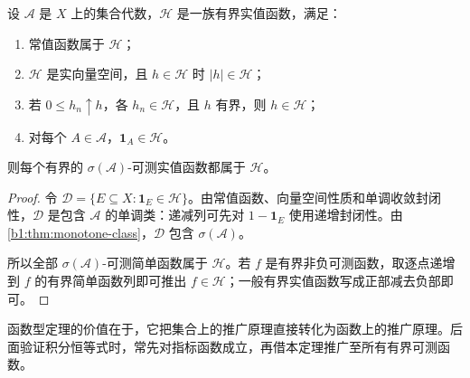 \begin{theorem}
\label{b1:thm:functional-monotone-class}
设 \(\mathcal A\) 是 \(X\) 上的集合代数，\(\mathcal H\) 是一族有界实值函数，满足：
\begin{enumerate}
  \item 常值函数属于 \(\mathcal H\)；
  \item \(\mathcal H\) 是实向量空间，且 \(h\in\mathcal H\) 时 \(\lvert h\rvert\in\mathcal H\)；
  \item 若 \(0\leq h_n\uparrow h\)，各 \(h_n\in\mathcal H\)，且 \(h\) 有界，则 \(h\in\mathcal H\)；
  \item 对每个 \(A\in\mathcal A\)，\(\mathbf 1_A\in\mathcal H\)。
\end{enumerate}
则每个有界的 \(\sigma(\mathcal A)\)-可测实值函数都属于 \(\mathcal H\)。
\end{theorem}
\begin{proof}
令 \(\mathcal D=\{E\subseteq X:\mathbf 1_E\in\mathcal H\}\)。由常值函数、向量空间性质和单调收敛封闭性，\(\mathcal D\) 是包含 \(\mathcal A\) 的单调类：递减列可先对 \(1-\mathbf 1_E\) 使用递增封闭性。由 \cref{b1:thm:monotone-class}，\(\mathcal D\) 包含 \(\sigma(\mathcal A)\)。

所以全部 \(\sigma(\mathcal A)\)-可测简单函数属于 \(\mathcal H\)。若 \(f\) 是有界非负可测函数，取逐点递增到 \(f\) 的有界简单函数列即可推出 \(f\in\mathcal H\)；一般有界实值函数写成正部减去负部即可。
\end{proof}

函数型定理的价值在于，它把集合上的推广原理直接转化为函数上的推广原理。后面验证积分恒等式时，常先对指标函数成立，再借本定理推广至所有有界可测函数。
